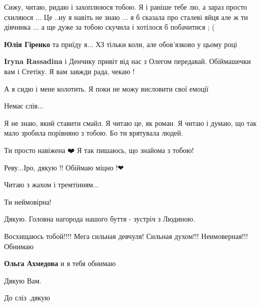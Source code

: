 
Сижу, читаю, ридаю і захоплююся тобою. Я і раніше тебе лю, а зараз просто
схиляюся ... Це ..ну я навіть не знаю ... я б сказала про сталеві яйця але ж ти
дівчинка ... а ще дуже за тобою скучила і хотілося б побачитися ; (

\begin{itemize} %
\textbf{Юлія Гіренко} та приїду я...
ХЗ тільки коли, але обов'язково у цьому році

\textbf{Iryna Rassadina} і Денчику привіт від нас з Олегом передавай. Обіймашечки вам і Стетіку. Я вам завжди рада, чекаю !
\end{itemize} %


А я сидю і мене колотить. Я поки не можу висловити свої емоції


Немає слів...


Я не знаю, який ставити смайл. Я читаю це, як роман. Я читаю і думаю, що так
мало зробила порівняно з тобою. Бо ти врятувала людей.

Ти просто навіжена ❤️ Я так пишаюсь, що знайома з тобою!


Реву...Іро, дякую !! Обіймаю міцно !❤


Читаю з жахом і тремтінням...


Ти неймовірна!


Дякую. Головна нагорода нашого буття - зустріч з Людиною.


Восхищаюсь тобой!!!! Мега сильная девчуля! Сильная духом!!! Неимоверная!!! Обнимаю

\begin{itemize} %
\textbf{Ольга Ахмедова} и я тебя обнимаю 🌼
\end{itemize} %


Дякую Вам.


До сліз .дякую


